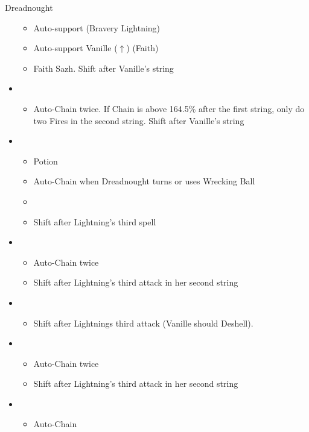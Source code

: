 \begin{battle}[2:16]{Dreadnought}
\begin{itemize}
			      \begin{itemize}
				      \item Auto-support (Bravery Lightning)
				      \item Auto-support Vanille ($\uparrow$) (Faith)
				      \item Faith Sazh. Shift after Vanille's string
			      \end{itemize}
			\item \fifth
			      \begin{itemize}
				      \item Auto-Chain twice. If Chain is above 164.5\% after the first string, only do two Fires in the second string. Shift after Vanille's string
			      \end{itemize}
			\item \fourth
			      \begin{itemize}
				      \item Potion
				      \item Auto-Chain when Dreadnought turns or uses Wrecking Ball
				      \item \stagger
				      \item Shift after Lightning's third spell
			      \end{itemize}
			\item \first
			      \begin{itemize}
				      \item Auto-Chain twice
				      \item Shift after Lightning's third attack in her second string
			      \end{itemize}
			\item \second
			      \begin{itemize}
				      \item Shift after Lightnings third attack (Vanille should Deshell).
			      \end{itemize}
			\item \first
			      \begin{itemize}
				      \item Auto-Chain twice
				      \item Shift after Lightning's third attack in her second string
			      \end{itemize}
			\item \third
			      \begin{itemize}
				      \item Auto-Chain
			      \end{itemize}
		\end{itemize}
\end{battle}

